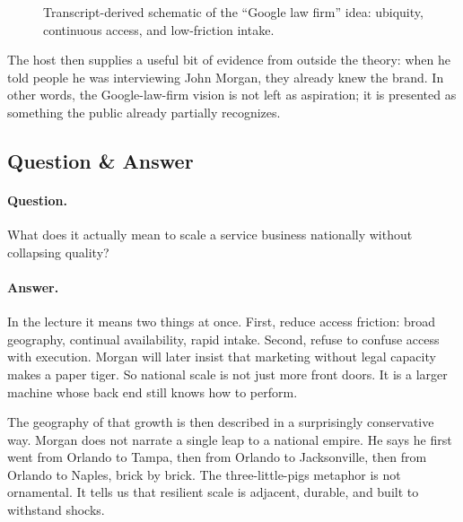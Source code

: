 \begin{figure}
\centering
{}
\caption{Transcript-derived schematic of the ``Google law firm'' idea: ubiquity, continuous access, and low-friction intake.}
\label{fig:google-law-refined}
\end{figure}

The host then supplies a useful bit of evidence from outside the theory: when he told people he was interviewing John Morgan, they already knew the brand. In other words, the Google-law-firm vision is not left as aspiration; it is presented as something the public already partially recognizes.

\subsection{Question \& Answer}

\paragraph{Question.} What does it actually mean to scale a service business nationally without collapsing quality?

\paragraph{Answer.} In the lecture it means two things at once. First, reduce access friction: broad geography, continual availability, rapid intake. Second, refuse to confuse access with execution. Morgan will later insist that marketing without legal capacity makes a paper tiger. So national scale is not just more front doors. It is a larger machine whose back end still knows how to perform.

The geography of that growth is then described in a surprisingly conservative way. Morgan does not narrate a single leap to a national empire. He says he first went from Orlando to Tampa, then from Orlando to Jacksonville, then from Orlando to Naples, brick by brick. The three-little-pigs metaphor is not ornamental. It tells us that resilient scale is adjacent, durable, and built to withstand shocks.

